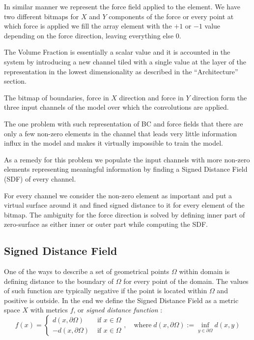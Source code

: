 In similar manner we represent the force field applied to the element.
We have two different bitmaps for $X$ and $Y$ components of the force or every point at which force is applied we fill the array element with the $+1$ or $-1$ value depending on the force direction, leaving everything else $0$.
\medskip

The Volume Fraction is essentially a scalar value and it is accounted in the system by introducing a new channel tiled with a single value at the layer of the representation in the lowest dimensionality as described in the ``Architecture'' section.
\medskip

The bitmap of boundaries, force in $X$ direction and force in $Y$ direction form the three input channels of the model over which the convolutions are applied.
\medskip

The one problem with such representation of BC and force fields that there are only a few non-zero elements in the channel that leads very little information influx in the model and makes it virtually impossible to train the model.
\medskip

As a remedy for this problem we populate the input channels with more non-zero elements representing meaningful information by finding a Signed Distance Field (SDF) of every channel.
\medskip

For every channel we consider the non-zero element as important and put a virtual surface around it and fined signed distance to it for every element of the bitmap.
The ambiguity for the force direction is solved by defining inner part of zero-surface as either inner or outer part while computing the SDF.

\subsection{Signed Distance Field}

One of the ways to describe a set of geometrical points $\Omega$ within domain is defining distance to the boundary of $\Omega$ for every point of the domain. 
The values of such function are typically negative if the point is located within $\Omega$ and positive is outside.
In the end we define the Signed Distance Field as a metric space $X$ with metrics $f$, or \textit{signed distance function} :    
\[ 
f(x) = 
	\begin{cases}
			d(x, \partial \Omega) & \mbox{ if } x\in\Omega  \\
			-d(x, \partial \Omega) & \mbox{ if } x\in\Omega 
	\end{cases} 
	, \quad \mathrm{where} \; d(x, \partial \Omega) := \inf_{y \in \partial \Omega}d(x, y)
\]

